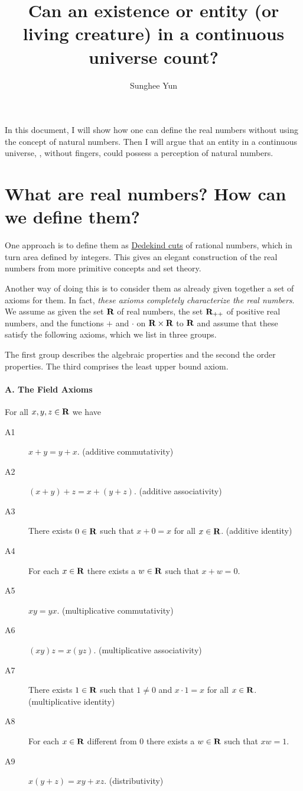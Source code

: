 \documentclass{article}
\title{Can an existence or entity (or living creature) in a continuous universe count?}
\author{Sunghee Yun}
\begin{document}
\maketitle

In this document,
I will show how one can define the real numbers without using the concept of natural numbers.
Then I will argue that an entity in a continuous universe, \eg, without fingers,
could possess a perception of natural numbers.

\section{What are real numbers? How can we define them?}

One approach is to define them as \href{https://en.wikipedia.org/wiki/Dedekind_cut}{Dedekind cuts}
of rational numbers, which in turn area defined by integers.
This gives an elegant construction of the real numbers from more primitive concepts and set theory.

Another way of doing this is to consider them as already given
together a set of axioms for them.
In fact, \emph{these axioms completely characterize the real numbers}.
We assume as given the set ${\mbox{\bf R}}$ of real numbers,
the set ${{\mbox{\bf R}}_{++}}$ of positive real numbers,
and the functions $+$ and $\cdot$ on ${\mbox{\bf R}}\times{\mbox{\bf R}}$ to ${\mbox{\bf R}}$
and assume that these satisfy the following axioms,
which we list in three groups.

The first group describes the algebraic properties
and the second the order properties.
The third comprises the least upper bound axiom.

\paragraph{A. The Field Axioms}
For all $x,y,z \in{\mbox{\bf R}}$ we have
\begin{description}
\item[A1] $x + y = y + x$. (additive commutativity)
\item[A2] $(x + y) + z = x + (y + z)$. (additive associativity)
\item[A3] There exists $0 \in{\mbox{\bf R}}$ such that $x+0=x$ for all $x\in{\mbox{\bf R}}$. (additive identity)
\item[A4] For each $x\in{\mbox{\bf R}}$ there exists a $w \in {\mbox{\bf R}}$ such that $x+w=0$.
\item[A5] $xy=yx$. (multiplicative commutativity)
\item[A6] $(xy)z=x(yz)$. (multiplicative associativity)
\item[A7] There exists $1 \in{\mbox{\bf R}}$ such that $1\neq0$ and $x\cdot1=x$ for all $x\in{\mbox{\bf R}}$. (multiplicative identity)
\item[A8] For each $x\in{\mbox{\bf R}}$ different from $0$ there exists a $w \in {\mbox{\bf R}}$ such that $xw=1$.
\item[A9] $x(y+z) = xy+xz$. (distributivity)
\end{description}
\end{document}
